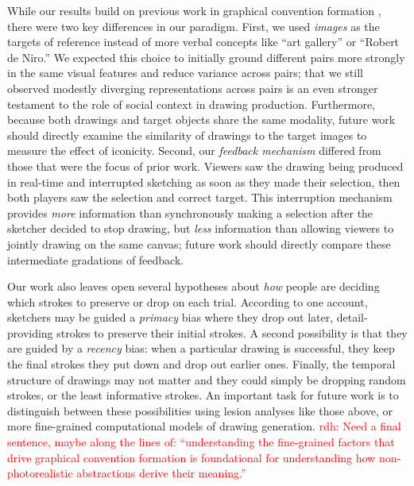 \documentclass[10pt,letterpaper]{article}
\newcommand{\rdh}[1]{\textcolor{Red}{rdh: #1}}
\begin{document}
While our results build on previous work in graphical convention formation \cite{garrod_foundations_2007,fay2010interactive}, there were two key differences in our paradigm.
First, we used \emph{images} as the targets of reference instead of more verbal concepts like ``art gallery'' or ``Robert de Niro.''
We expected this choice to initially ground different pairs more strongly in the same visual features and reduce variance across pairs; that we still observed modestly diverging representations across pairs is an even stronger testament to the role of social context in drawing production.
Furthermore, because both drawings and target objects share the same modality, future work should directly examine the similarity of drawings to the target images to measure the effect of iconicity.
Second, our \emph{feedback mechanism} differed from those that were the focus of prior work.
Viewers saw the drawing being produced in real-time and interrupted sketching as soon as they made their selection, then both players saw the selection and correct target.
This interruption mechanism provides \emph{more} information than synchronously making a selection after the sketcher decided to stop drawing, but \emph{less} information than allowing viewers to jointly drawing on the same canvas; future work should directly compare these intermediate gradations of feedback.

Our work also leaves open several hypotheses about \emph{how} people are deciding which strokes to preserve or drop on each trial.
According to one account, sketchers may be guided a \emph{primacy} bias where they drop out later, detail-providing strokes to preserve their initial strokes.
A second possibility is that they are guided by a \emph{recency} bias: when a particular drawing is successful, they keep the final strokes they put down and drop out earlier ones.
Finally, the temporal structure of drawings may not matter and they could simply be dropping random strokes, or the least informative strokes.
An important task for future work is to distinguish between these possibilities using lesion analyses like those above, or more fine-grained computational models of drawing generation.
\rdh{Need a final sentence, maybe along the lines of: ``understanding the fine-grained factors that drive graphical convention formation is foundational for understanding how non-photorealistic abstractions derive their meaning.''}
\end{document}
